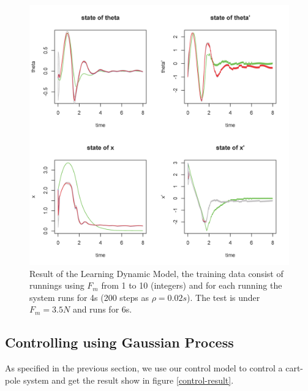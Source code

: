 \documentclass[11pt,twoside,a4paper]{article}
\begin{document}
\begin{figure}[!]
\centering
\includegraphics[width=14cm]{learning-result2.png}
\caption{Result of the Learning Dynamic Model, the training data
  consist of runnings using $F_m$ from 1 to 10 (integers) and for each
  running the system runs for 4s (200 steps as $\rho = 0.02s$). The
  test is under $F_m = 3.5N$ and runs for 6s.}
\label{learning-result3}
\end{figure}


\subsection{Controlling using Gaussian Process}

As specified in the previous section, we use our control model to
control a cart-pole system and get the result show in figure \ref{control-result}.\\
\end{document}
